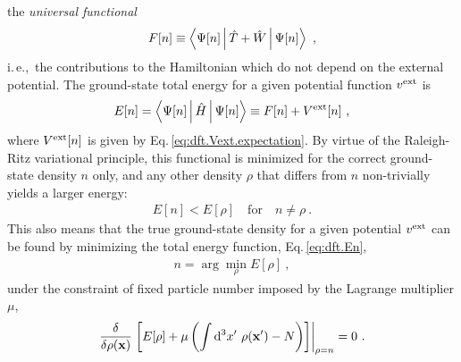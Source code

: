  the \emph{universal functional} 
\begin{align}
	F[n] \equiv \Braket{\Psi [n] | \hat T + \hat W | \Psi [n]}~,
	\label{eq:dft.Fn}
\end{align}
i.\,e.,~the contributions to the Hamiltonian which do not depend on the external potential. The ground-state total energy for a given potential function $v^{\rm ext}$ is
\begin{align}
	E [n] 
		= \Braket{\Psi [n] | \hat H | \Psi [n]}
		\equiv F[n] + V^{\rm ext}[n]~,
	\label{eq:dft.En}
\end{align}
where $V^{\rm ext}[n]$ is given by Eq.\,\eqref{eq:dft.Vext.expectation}.
By virtue of the Raleigh-Ritz variational principle, this functional is minimized for the correct ground-state density $n$ only, and any other density $\rho$ that differs from $n$ non-trivially yields a larger energy:
\begin{align}
	E[n] < E [\rho] \quad \text{for} \quad n \neq \rho~.
\end{align}
This also means that the true ground-state density for a given potential $v^{\rm ext}$ can be found by minimizing the total energy function, Eq.\,\eqref{eq:dft.En},
\begin{align}
	n = \arg \min_{\rho} E[\rho]~,
	\label{eq:dft.n}
\end{align}
under the constraint of fixed particle number imposed by the Lagrange multiplier $\mu$,
\begin{align}
	\frac{\delta}{\delta \rho ({\bf x})}
		\left.\left[ 
			E[\rho] + \mu \left(
				\int \d^3 x' ~ \rho ({\bf x}') - N \right)
		\right]\right\vert_{\rho = n}
		=0~.
		\label{eq:dft.stationarity}
\end{align}


